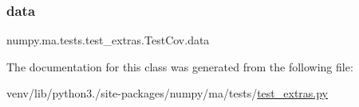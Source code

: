 \subsubsection{\texorpdfstring{data}{data}}
{\footnotesize\ttfamily numpy.\+ma.\+tests.\+test\+\_\+extras.\+Test\+Cov.\+data}



The documentation for this class was generated from the following file\+:\begin{DoxyCompactItemize}
\item 
venv/lib/python3./site-\/packages/numpy/ma/tests/\hyperlink{test__extras_8py}{test\+\_\+extras.\+py}\end{DoxyCompactItemize}
